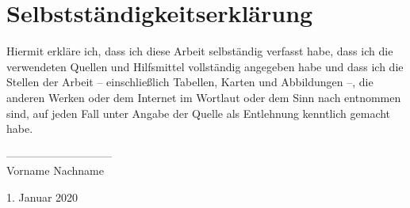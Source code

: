\section*{Selbstständigkeitserklärung}

Hiermit erkläre ich, dass ich diese Arbeit
    selbständig verfasst habe, dass ich die verwendeten Quellen
    und Hilfsmittel vollständig angegeben habe und dass ich die
    Stellen der Arbeit -- einschließlich Tabellen, Karten und
    Abbildungen --, die anderen Werken oder dem Internet im Wortlaut
    oder dem Sinn nach entnommen sind, auf jeden Fall unter Angabe
    der Quelle als Entlehnung kenntlich gemacht habe.
    
\vspace{2cm}

\begin{flushright}
	-----------------------------\\
	Vorname Nachname \par
	1. Januar 2020
\end{flushright}
